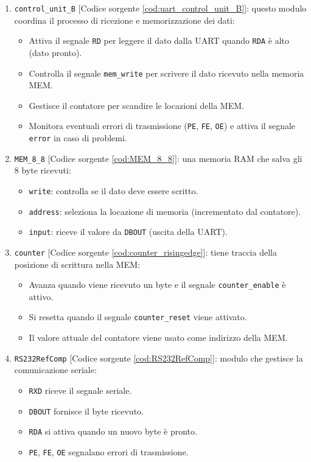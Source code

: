 \begin{enumerate}
    \item \texttt{control\_unit\_B} [Codice sorgente \ref{cod:uart_control_unit_B}]: questo modulo coordina il processo di ricezione e memorizzazione dei dati:
    \begin{itemize}
        \item Attiva il segnale \texttt{RD} per leggere il dato dalla UART quando \texttt{RDA} è alto (dato pronto).
        \item Controlla il segnale \texttt{mem\_write} per scrivere il dato ricevuto nella memoria MEM.
        \item Gestisce il contatore per scandire le locazioni della MEM.
        \item Monitora eventuali errori di trasmissione (\texttt{PE}, \texttt{FE}, \texttt{OE}) e attiva il segnale \texttt{error} in caso di problemi.
    \end{itemize}
    \item \texttt{MEM\_8\_8} [Codice sorgente \ref{cod:MEM_8_8}]: una memoria RAM che salva gli 8 byte ricevuti:
    \begin{itemize}
        \item \texttt{write}: controlla se il dato deve essere scritto.
        \item \texttt{address}: seleziona la locazione di memoria (incrementato dal contatore).
        \item \texttt{input}: riceve il valore da \texttt{DBOUT} (uscita della UART).
    \end{itemize}
    \item \texttt{counter} [Codice sorgente \ref{cod:counter_risingedge}]: tiene traccia della posizione di scrittura nella MEM:
    \begin{itemize}
        \item Avanza quando viene ricevuto un byte e il segnale \texttt{counter\_enable} è attivo.
        \item Si resetta quando il segnale \texttt{counter\_reset} viene attivato.
        \item Il valore attuale del contatore viene usato come indirizzo della MEM.
    \end{itemize}
    \item \texttt{RS232RefComp} [Codice sorgente \ref{cod:RS232RefComp}]: modulo che gestisce la comunicazione seriale:
    \begin{itemize}
        \item \texttt{RXD} riceve il segnale seriale.
        \item \texttt{DBOUT} fornisce il byte ricevuto.
        \item \texttt{RDA} si attiva quando un nuovo byte è pronto.
        \item \texttt{PE}, \texttt{FE}, \texttt{OE} segnalano errori di trasmissione.
    \end{itemize}
\end{enumerate}

